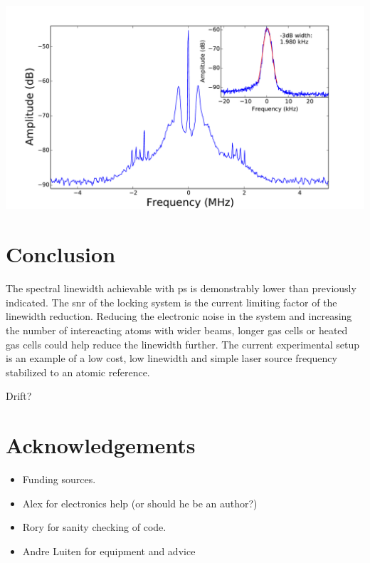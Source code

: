 \documentclass{article}
\newenvironment{Figure}
  {\par\medskip\noindent\minipage{\linewidth}}
  {\endminipage\par\medskip}
\begin{document}
\begin{multicols}{2}
\begin{Figure}
    \centering
    \includegraphics[width=\linewidth]{Figs/beatnote_inset.pdf}
    \captionsetup{type=figure}
    \label{beatnote}
\end{Figure}

\section{Conclusion}

The spectral linewidth achievable with \gls*{ps} is demonstrably lower than previously indicated. The \gls*{snr} of the locking system is the current limiting factor of the linewidth reduction. Reducing the electronic noise in the system and increasing the number of intereacting atoms with wider beams, longer gas cells or heated gas cells could help reduce the linewidth further. The current experimental setup is an example of a low cost, low linewidth and simple laser source frequency stabilized to an atomic reference.

{\color{red}Drift?}

\section{Acknowledgements}
\begin{itemize}
\item Funding sources.
\item Alex for electronics help (or should he be an author?)
\item Rory for sanity checking of code.
\item Andre Luiten for equipment and advice
\end{itemize}




\end{multicols}
\end{document}
